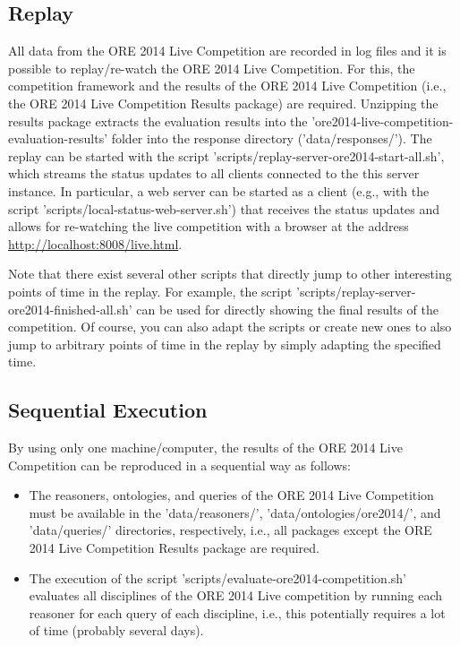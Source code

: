 \documentclass{article}
\begin{document}
\subsection{Replay}

All data from the ORE 2014 Live Competition are recorded in log files and it is possible to replay/re-watch the ORE 2014 Live Competition. 
For this, the competition framework and the results of the ORE 2014 Live Competition (i.e., the ORE 2014 Live Competition Results package) are required. 
Unzipping the results package extracts the evaluation results into the 'ore2014-live-competition-evaluation-results' folder into the response directory ('data/responses/').
The replay can be started with the script 'scripts/replay-server-ore2014-start-all.sh', which streams the status updates to all clients connected to the this server instance. 
In particular, a web server can be started as a client (e.g., with the script 'scripts/local-status-web-server.sh') that receives the status updates and allows for re-watching the live competition with a browser at the address \url{http://localhost:8008/live.html}.

Note that there exist several other scripts that directly jump to other interesting points of time in the replay. For example, the script 'scripts/replay-server-ore2014-finished-all.sh' can be used for directly showing the final results of the competition.
Of course, you can also adapt the scripts or create new ones to also jump to arbitrary points of time in the replay by simply adapting the specified time.


\subsection{Sequential Execution}

By using only one machine/computer, the results of the ORE 2014 Live Competition can be reproduced in a sequential way as follows:
\begin{itemize}
\item The reasoners, ontologies, and queries of the ORE 2014 Live Competition must be available in the 'data/reasoners/', 'data/ontologies/ore2014/', and 'data/queries/' directories, respectively, i.e., all packages except the ORE 2014 Live Competition Results package are required.
\item The execution of the script 'scripts/evaluate-ore2014-competition.sh' evaluates all disciplines of the ORE 2014 Live competition by running each reasoner for each query of each discipline, i.e., this potentially requires a lot of time (probably several days).

\end{itemize}
\end{document}
